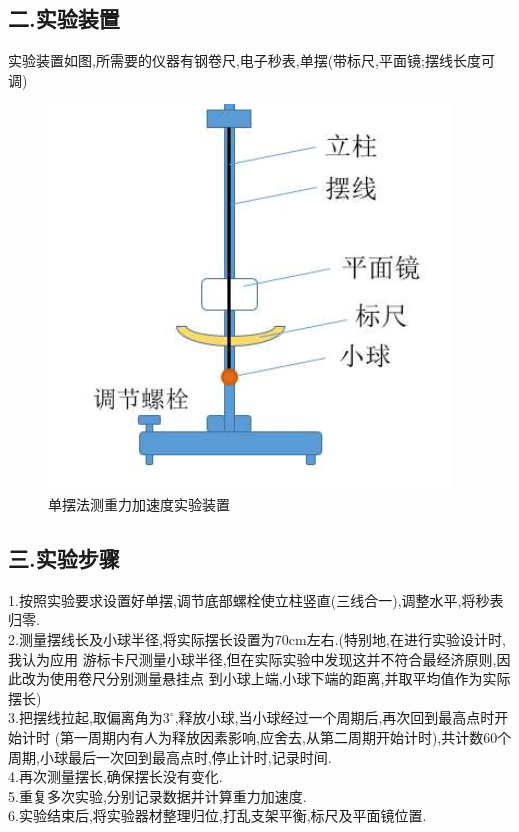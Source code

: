 \documentclass[12pt,a4paper,oneside]{ctexart}
\begin{document}
\subsection*{二.实验装置}
实验装置如图,所需要的仪器有钢卷尺,电子秒表,单摆(带标尺,平面镜;摆线长度可调)
\begin{figure}[H]
    \centering
    \includegraphics[scale=0.8]{db.png}
    \caption{单摆法测重力加速度实验装置}
\end{figure}
\subsection*{三.实验步骤}\noindent
1.按照实验要求设置好单摆,调节底部螺栓使立柱竖直(三线合一),调整水平,将秒表归零.\\
2.测量摆线长及小球半径,将实际摆长设置为70cm左右.(特别地,在进行实验设计时,我认为应用
游标卡尺测量小球半径,但在实际实验中发现这并不符合最经济原则,因此改为使用卷尺分别测量悬挂点
到小球上端,小球下端的距离,并取平均值作为实际摆长)\\
3.把摆线拉起,取偏离角为$3^{\circ}$,释放小球,当小球经过一个周期后,再次回到最高点时开始计时
(第一周期内有人为释放因素影响,应舍去,从第二周期开始计时),共计数60个周期,小球最后一次回到最高点时,停止计时,记录时间.\\
4.再次测量摆长,确保摆长没有变化.\\
5.重复多次实验,分别记录数据并计算重力加速度.\\
6.实验结束后,将实验器材整理归位,打乱支架平衡,标尺及平面镜位置.
\end{document}

